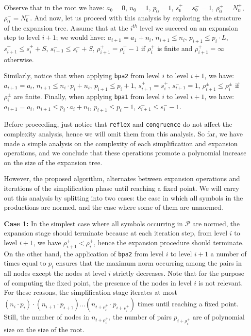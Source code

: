 Observe that in the root we have: $a_0=0$, $n_0=1$, $p_0=1$,
$s_0^+=s_0^-=1$, $\rho_0^+=N_0^+$, $\rho_0^-=N_0^-$. And now, let us proceed
with this analysis by exploring the structure of the expansion tree. Assume 
that at the $i^{th}$ level we succeed on an expansion step to
level $i+1$;
we would have: $a_{i+1}=a_1+n_i$, $n_{i+1}\leq n_i$, 
$p_{i+1}\leq p_i\cdot L$,
$s_{i+1}^+\leq s_i^++S$, $s_{i+1}^-\leq s_i^-+S$, $\rho_{i+1}^+=\rho_i^+-1$ 
if $\rho_i^+$ is finite and  $\rho_{i+1}^+ = \infty$ otherwise.

Similarly, notice that when applying \lstinline{bpa2} from level $i$
to level $i+1$, we have: $a_{i+1}=a_i$, $n_{i+1} \leq n_i\cdot p_i + n_i$,
$p_{i+1} \leq p_i+1$, $s_{i+1}^+=s_i^+$, $s_{i+1}^-=1$, 
$\rho_{i+1}^\pm\leq \rho_i^\pm$ if $\rho_i^\pm$ are finite. 
Finally, when applying \lstinline{bpa1} from level $i$
to level $i+1$, we have: $a_{i+1}=a_i$, $n_{i+1} \leq p_i \cdot a_i+n_i$,
$p_{i+1}\leq p_i+1$, $s_{i+1}^- \leq s_i^- - 1$.

Before proceeding, just notice that \lstinline{reflex} and 
\lstinline{congruence} do not affect the complexity analysis, hence 
we will omit them from this analysis.
So far, we have made a simple analysis on the complexity of each 
simplification and expansion operations, and we conclude that
these operations promote a polynomial increase on the size of the
expansion tree. 

However, the proposed algorithm, alternates between expansion 
operations and iterations of the simplification phase until 
reaching a fixed point. We will carry out this analysis by 
splitting into two cases: the case in which all symbols 
in the productions are normed, and the case where some
of them are unnormed.\smallskip

\noindent\textbf{Case 1:} In the simplest case where all symbols
occurring in $\mathcal{P}$ are normed, the expansion stage should 
terminate because at each iteration step, from level $i$ to level
$i+1$, we have $\rho_{i+1}^+ < \rho_i^+$, hence the expansion procedure 
should terminate.
On the other hand, the application of \lstinline{bpa2} from 
level $i$ to level $i+1$ a number of times equal to $p_i$
ensures that the maximum norm occurring among the pairs in
all nodes except the nodes at level $i$ strictly decreases.
Note that for the purpose of computing the fixed point, the
presence of the nodes in level $i$ is not relevant.
For these reasons, the simplification stage iterates at most 
$(n_i\cdot p_i)\cdot (n_{i+1}\cdot p_{i+1})\ldots (n_{i+\rho_i^+}\cdot
p_{i+\rho_i^+})$ times until reaching a fixed point. 
Still, the number of nodes in $n_{i+\rho_i^+}$, 
the number of pairs $p_{i+\rho_i^+}$ are of polynomial size on the 
size of the root.\smallskip

